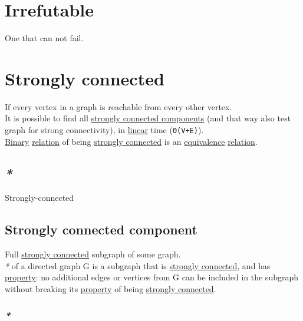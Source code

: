 \documentclass[a4paper,14pt,oneside]{book}
\begin{document}
\chapter{\label{orgaedb44e}Irrefutable}
\label{sec:org0aedd75}
One that can not fail.\\

\chapter{\label{orga9bcbd1}Strongly connected}
\label{sec:orgba6b328}
If every vertex in a graph is reachable from every other vertex.\\

It is possible to find all \hyperref[orgd62a1dc]{strongly connected components} (and that way also test graph for strong connectivity), in \hyperref[org9fc0700]{linear} time (\texttt{Θ(V+E)}).\\

\hyperref[org969957a]{Binary} \hyperref[org02f2832]{relation} of being \hyperref[orga9bcbd1]{strongly connected} is an \hyperref[org841678d]{equivalence} \hyperref[org02f2832]{relation}.\\

\section{\emph{*}}
\label{sec:orgcd15f4c}

\label{org87cce35}Strongly-connected\\

\section{\label{org9a34cbf}Strongly connected component}
\label{sec:org2c61532}
Full \hyperref[orga9bcbd1]{strongly connected} subgraph of some graph.\\

\emph{*} of a directed graph G is a subgraph that is \hyperref[orga9bcbd1]{strongly connected}, and has \hyperref[orgc713167]{property}: no additional edges or vertices from G can be included in the subgraph without breaking its \hyperref[orgc713167]{property} of being \hyperref[orga9bcbd1]{strongly connected}.\\

\subsection{\emph{*}}
\label{sec:org6edfa73}
\end{document}
